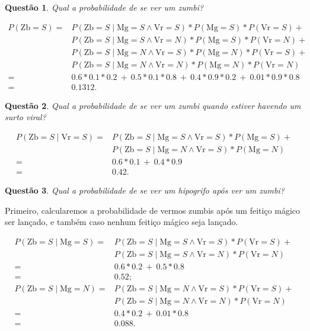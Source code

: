 \documentclass{article}
\newtheorem{question}{Questão}
\newcommand{\Mg}{\mathrm{Mg}}
\newcommand{\Vr}{\mathrm{Vr}}
\newcommand{\Zb}{\mathrm{Zb}}
\begin{document}
\begin{question}
    Qual a probabilidade de se ver um zumbi?
\end{question}

\begin{align*}
    P (\Zb = S) =
        & P(\Zb = S \mid \Mg = S \wedge \Vr = S ) * P(\Mg = S) * P(\Vr = S) + {} \\
        & P(\Zb = S \mid \Mg = S \wedge \Vr = N ) * P(\Mg = S) * P(\Vr = N) + {} \\
        & P(\Zb = S \mid \Mg = N \wedge \Vr = S ) * P(\Mg = N) * P(\Vr = S) + {} \\
        & P(\Zb = S \mid \Mg = N \wedge \Vr = N ) * P(\Mg = N) * P(\Vr = N) \\
    = & 0.6*0.1*0.2 \ +\  0.5*0.1*0.8 \ +\  0.4*0.9*0.2 \ +\  0.01*0.9*0.8 \\
    = & 0.1312.
\end{align*}

\begin{question}
    Qual a probabilidade de se ver um zumbi quando estiver havendo um surto viral?
\end{question}

\begin{align*}
    P (\Zb = S \mid \Vr = S) =
        & P(\Zb = S \mid \Mg = S \wedge \Vr = S ) * P(\Mg = S) + {} \\
        & P(\Zb = S \mid \Mg = N \wedge \Vr = S ) * P(\Mg = N) \\
    = & 0.6*0.1 \ +\  0.4*0.9 \\
    = & 0.42.
\end{align*}

\begin{question}
    Qual a probabilidade de se ver um hipogrifo após ver um zumbi?
\end{question}

Primeiro, calcularemos a probabilidade de vermos zumbis
após um feitiço mágico ser lançado,
e também caso nenhum feitiço mágico seja lançado.

\begin{align*}
    P (\Zb = S \mid \Mg = S) =
        & P(\Zb = S \mid \Mg = S \wedge \Vr = S ) * P(\Vr = S) + {} \\
        & P(\Zb = S \mid \Mg = S \wedge \Vr = N ) * P(\Vr = N) \\
    = & 0.6*0.2 \ +\  0.5*0.8 \\
    = & 0.52; \\
    P (\Zb = S \mid \Mg = N) =
        & P(\Zb = S \mid \Mg = N \wedge \Vr = S ) * P(\Vr = S) + {} \\
        & P(\Zb = S \mid \Mg = N \wedge \Vr = N ) * P(\Vr = N) \\
    = & 0.4*0.2 \ +\  0.01*0.8 \\
    = & 0.088.
\end{align*}
\end{document}
